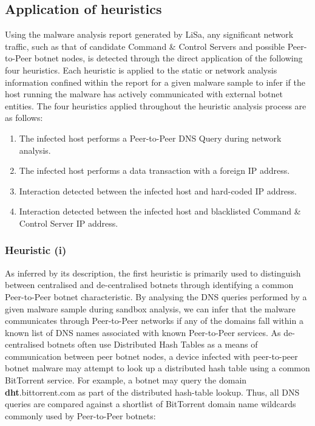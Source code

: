 \subsection{Application of heuristics}

Using the malware analysis report generated by LiSa, any significant network traffic, such as that of candidate Command \& Control Servers and possible Peer-to-Peer botnet nodes, is detected through the direct application of the following four heuristics. Each heuristic is applied to the static or network analysis information confined within the report for a given malware sample to infer if the host running the malware has actively communicated with external botnet entities. The four heuristics applied throughout the heuristic analysis process are as follows:

\begin{enumerate}[i]
    \item The infected host performs a Peer-to-Peer DNS Query during network analysis.
    \item The infected host performs a data transaction with a foreign IP address.
    \item Interaction detected between the infected host and hard-coded IP address.
    \item Interaction detected between the infected host and blacklisted Command \& Control Server IP address.
\end{enumerate}

\subsubsection{Heuristic (i)}

As inferred by its description, the first heuristic is primarily used to distinguish between centralised and de-centralised botnets through identifying a common Peer-to-Peer botnet characteristic. By analysing the DNS queries performed by a given malware sample during sandbox analysis, we can infer that the malware communicates through Peer-to-Peer networks if any of the domains fall within a known list of DNS names associated with known Peer-to-Peer services. As de-centralised botnets often use Distributed Hash Tables as a means of communication between peer botnet nodes, a device infected with peer-to-peer botnet malware may attempt to look up a distributed hash table using a common BitTorrent service. For example, a botnet may query the domain \textbf{dht}.bittorrent.com as part of the distributed hash-table lookup. Thus, all DNS queries are compared against a shortlist of BitTorrent domain name wildcards commonly used by Peer-to-Peer botnets:

